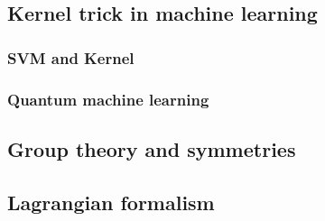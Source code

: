 \subsection{Kernel trick in machine learning}
\subsubsection{SVM and Kernel}
\subsubsection{Quantum machine learning}

\subsection{Group theory and symmetries}

\subsection{Lagrangian formalism}\label{sec:lagrangian}
\cite{xuLagrangianFormalismQuantum2021}